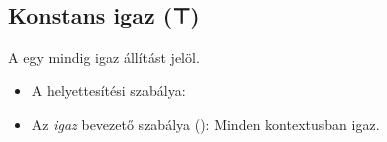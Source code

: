 \begin{itemize}
\begin{code}%
%
\>[6]%
\>[12]\AgdaSymbol{:}%
\>[755I]\AgdaSpace{}%
\AgdaSpace{}%
\AgdaSpace{}%
\AgdaSymbol{\}}\AgdaSpace{}%
\AgdaSpace{}%
\AgdaSpace{}%
\AgdaSymbol{(}\AgdaSpace{}%
\AgdaSpace{}%
\AgdaSymbol{)}\AgdaSpace{}%
\AgdaSymbol{(}\AgdaSpace{}%
\AgdaOperator{\AgdaField{[}}\AgdaSpace{}%
\AgdaSpace{}%
\AgdaOperator{\AgdaField{]ᶠ}}\AgdaSymbol{)}\AgdaSpace{}%
\AgdaSpace{}%
\AgdaSpace{}%
\AgdaSymbol{(}\AgdaSpace{}%
\AgdaSpace{}%
\AgdaSymbol{)}\AgdaSpace{}%
\AgdaSymbol{(}\AgdaSpace{}%
\AgdaOperator{\AgdaField{[}}\AgdaSpace{}%
\AgdaSpace{}%
\AgdaOperator{\AgdaField{]ᶠ}}\AgdaSymbol{)}\<%
\\
\>[.][@{}l@{}]\<[755I]%
\>[14]\AgdaSpace{}%
\AgdaSpace{}%
\AgdaSpace{}%
\AgdaSymbol{(}\AgdaSpace{}%
\AgdaSpace{}%
\AgdaSymbol{)}\AgdaSpace{}%
\AgdaSpace{}%
\AgdaSpace{}%
\AgdaSpace{}%
\<%
\end{code}
\end{itemize}

\subsection{Konstans igaz (⊤)}
A  egy mindig igaz állítást jelöl.
\begin{code}%
%
\>[6]%
\>[12]\AgdaSymbol{:}\AgdaSpace{}%
\AgdaSymbol{\}}\AgdaSpace{}%
\AgdaSpace{}%
\AgdaSpace{}%
\<%
\end{code}

\begin{itemize}
\item A  helyettesítési szabálya:
\begin{code}%
%
\>[6]%
\>[12]\AgdaSymbol{:}\AgdaSpace{}%
\AgdaSpace{}%
\AgdaSymbol{\}\{}\AgdaSpace{}%
\AgdaSymbol{:}\AgdaSpace{}%
\AgdaSpace{}%
\AgdaSpace{}%
\AgdaSymbol{\}}\AgdaSpace{}%
\AgdaSpace{}%
\AgdaSpace{}%
\AgdaOperator{\AgdaField{[}}\AgdaSpace{}%
\AgdaSpace{}%
\AgdaOperator{\AgdaField{]ᶠ}}\AgdaSpace{}%
\AgdaSpace{}%
\<%
\end{code}
\item Az \textit{igaz} bevezető szabálya (): Minden kontextusban igaz.
\begin{code}%
%
\>[6]%
\>[12]\AgdaSymbol{:}\AgdaSpace{}%
\AgdaSymbol{\}}\AgdaSpace{}%
\AgdaSpace{}%
\AgdaSpace{}%
\AgdaSpace{}%
\<%
\end{code}
\end{itemize}

